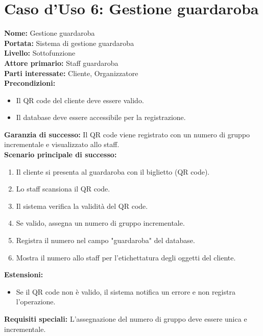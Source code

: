 \documentclass[a4paper,12pt]{article}
\begin{document}
{\section*{\textcolor{sectioncolor}{Caso d'Uso 6: Gestione guardaroba}}
\textcolor{textcolor}{
\textbf{Nome:} Gestione guardaroba\\
\textbf{Portata:} Sistema di gestione guardaroba\\
\textbf{Livello:} Sottofunzione\\
\textbf{Attore primario:} Staff guardaroba\\
\textbf{Parti interessate:} Cliente, Organizzatore\\
\textbf{Precondizioni:}
\begin{itemize}
    \item Il QR code del cliente deve essere valido.
    \item Il database deve essere accessibile per la registrazione.
\end{itemize}
\textbf{Garanzia di successo:} Il QR code viene registrato con un numero di gruppo incrementale e visualizzato allo staff.\\
\textbf{Scenario principale di successo:}
\begin{enumerate}
    \item Il cliente si presenta al guardaroba con il biglietto (QR code).
    \item Lo staff scansiona il QR code.
    \item Il sistema verifica la validità del QR code.
    \item Se valido, assegna un numero di gruppo incrementale.
    \item Registra il numero nel campo "guardaroba" del database.
    \item Mostra il numero allo staff per l'etichettatura degli oggetti del cliente.
\end{enumerate}
\textbf{Estensioni:}
\begin{itemize}
    \item  Se il QR code non è valido, il sistema notifica un errore e non registra l'operazione.
\end{itemize}
\textbf{Requisiti speciali:} L'assegnazione del numero di gruppo deve essere unica e incrementale.
}

}
\end{document}
